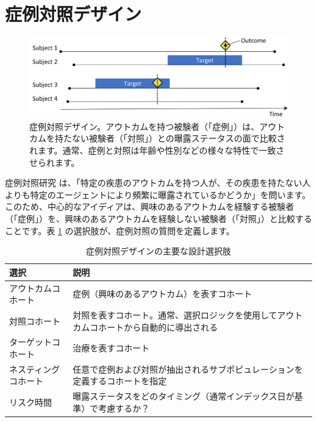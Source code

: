 \documentclass[
  11pt]{book}
\theoremstyle{definition}
\theoremstyle{definition}
\theoremstyle{definition}
\theoremstyle{definition}
\theoremstyle{remark}
\begin{document}
\section{症例対照デザイン}\label{ux75c7ux4f8bux5bfeux7167ux30c7ux30b6ux30a4ux30f3}


\begin{figure}[h]

{\centering \includegraphics[width=0.9\linewidth]{images/PopulationLevelEstimation/caseControl} 

}

\caption{症例対照デザイン。アウトカムを持つ被験者（「症例」）は、アウトカムを持たない被験者（「対照」）との曝露ステータスの面で比較されます。通常、症例と対照は年齢や性別などの様々な特性で一致させられます。}\label{fig:caseControl}
\end{figure}

症例対照研究 \citep{vandenbroucke_2012} は、「特定の疾患のアウトカムを持つ人が、その疾患を持たない人よりも特定のエージェントにより頻繁に曝露されているかどうか」を問います。このため、中心的なアイディアは、興味のあるアウトカムを経験する被験者（「症例」）を、興味のあるアウトカムを経験しない被験者（「対照」）と比較することです。表 \ref{tab:ccChoices} の選択肢が、症例対照の質問を定義します。  

\begin{table}
\centering
\caption{\label{tab:ccChoices}症例対照デザインの主要な設計選択肢}
\centering
\begin{tabular}[t]{l>{\raggedright\arraybackslash}p{9cm}}
\toprule
選択 & 説明\\
\midrule
アウトカムコホート & 症例（興味のあるアウトカム）を表すコホート\\
対照コホート & 対照を表すコホート。通常、選択ロジックを使用してアウトカムコホートから自動的に導出される\\
ターゲットコホート & 治療を表すコホート\\
ネスティングコホート & 任意で症例および対照が抽出されるサブポピュレーションを定義するコホートを指定\\
リスク時間 & 曝露ステータスをどのタイミング（通常インデックス日が基準）で考慮するか？\\
\bottomrule
\end{tabular}
\end{table}
\end{document}
